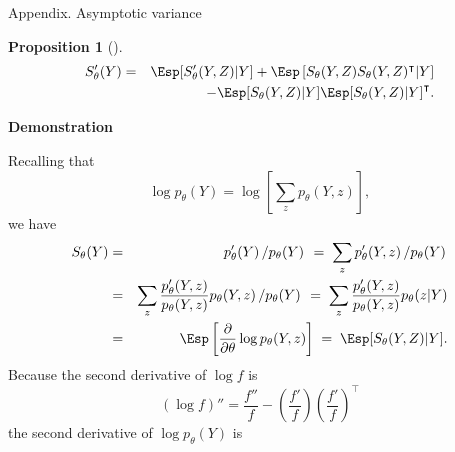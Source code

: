 \documentclass[compress,10pt]{beamer}
\newtheorem{proposition}{Proposition}
\begin{document}
 
 
\begin{frame}[allowframebreaks]{Appendix. Asymptotic variance}

\label{App:AssVar}

\begin{proposition}[\cite{Louis82}]
\begin{eqnarray*}
   S_\theta'(Y) &=& \Esp[S_\theta'(Y, Z) | Y] +  \Esp\left[S_\theta(Y, Z) S_\theta(Y, Z)^\intercal | Y \right]\\
   && - \Esp[S_ \theta(Y, Z) | Y] \Esp[S_ \theta(Y, Z) | Y]^\intercal.
\end{eqnarray*}
\end{proposition}

\textbf{Demonstration}

Recalling that
$$
\log p_\theta(Y) = \log \left[\sum_z p_\theta(Y, z) \right], 
$$
we have
\begin{eqnarray}
  S_ \theta(Y)  & = & p_\theta'(Y) \left/ p_\theta(Y) \right. \; = \; \sum_z p'_\theta(Y, z) \left/ p_\theta(Y) \right. \nonumber \nonumber \\ 
  & = & \sum_z \frac{p'_\theta(Y, z)}{p_\theta(Y, z)} p_\theta(Y, z) \left/p_\theta(Y) \right.
  \; = \; \sum_z \frac{p'_\theta(Y, z)}{p_\theta(Y, z)} p_\theta(z | Y) \nonumber \\
  & = & \Esp\left[\frac{\partial}{\partial \theta} \log p_\theta(Y, z) \right]  \; = \; \Esp[S_ \theta(Y, Z) | Y]. \label{Eq:LouisTrick}
\end{eqnarray} 
Because the second derivative of $\log f$ is 
\begin{equation} \label{Eq:Der2ndLog}
(\log f)'' = \frac{f''}{f} - \left(\frac{f'}{f}\right) \left(\frac{f'}{f}\right)^{\intercal}
\end{equation}
the second derivative of $\log p_\theta(Y)$ is


\end{frame}
\end{document}
